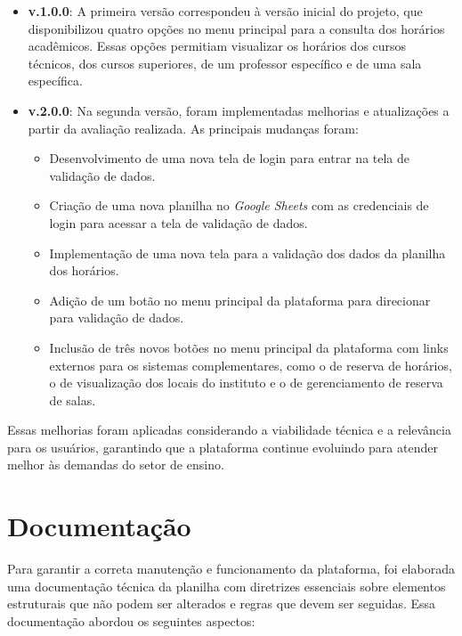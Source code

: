 \begin{itemize}
    \item \textbf{v.1.0.0}: A primeira versão correspondeu à versão inicial do projeto, que disponibilizou quatro opções no menu principal para a consulta dos horários acadêmicos. Essas opções permitiam visualizar os horários dos cursos técnicos, dos cursos superiores, de um professor específico e de uma sala específica.
    \item \textbf{v.2.0.0}: Na segunda versão, foram implementadas melhorias e atualizações a partir da avaliação realizada. As principais mudanças foram:
    \begin{itemize}
        \item Desenvolvimento de uma nova tela de login para entrar na tela de validação de dados.
        \item Criação de uma nova planilha no \textit{Google Sheets} com as credenciais de login para acessar a tela de validação de dados.
        \item Implementação de uma nova tela para a validação dos dados da planilha dos horários.
        \item Adição de um botão no menu principal da plataforma para direcionar para validação de dados.
        \item Inclusão de três novos botões no menu principal da plataforma com links externos para os sistemas complementares, como o de reserva de horários, o de visualização dos locais do instituto e o de gerenciamento de reserva de salas.
    \end{itemize}
\end{itemize}

Essas melhorias foram aplicadas considerando a viabilidade técnica e a relevância para os usuários, garantindo que a plataforma continue evoluindo para atender melhor às demandas do setor de ensino.

\section{Documentação}

Para garantir a correta manutenção e funcionamento da plataforma, foi elaborada uma documentação técnica da planilha com diretrizes essenciais sobre elementos estruturais que não podem ser alterados e regras que devem ser seguidas. Essa documentação abordou os seguintes aspectos:

